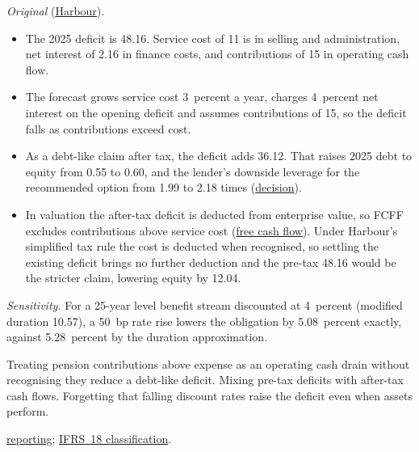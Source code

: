\begin{qfmethod}
 \emph{Original} (\hyperref[ex:harbour-tools-statements]{Harbour}).
\begin{itemize}
\item The 2025 deficit is 48.16. Service cost of 11 is in selling and administration, net interest of 2.16 in finance costs, and contributions of 15 in operating cash flow.
\item The forecast grows service cost 3~percent a year, charges 4~percent net interest on the opening deficit and assumes contributions of 15, so the deficit falls as contributions exceed cost.
\item As a debt-like claim after tax, the deficit adds 36.12. That raises 2025 debt to equity from 0.55 to 0.60, and the lender's downside leverage for the recommended option from 1.99 to 2.18 times (\hyperref[ex:integrated-credit-decision]{decision}).
\item In valuation the after-tax deficit is deducted from enterprise value, so FCFF excludes contributions above service cost (\hyperref[meth:free-cash-flow-coverage]{free cash flow}). Under Harbour's simplified tax rule the cost is deducted when recognised, so settling the existing deficit brings no further deduction and the pre-tax 48.16 would be the stricter claim, lowering equity by 12.04.
\end{itemize}
\emph{Sensitivity.} For a 25-year level benefit stream discounted at 4~percent (modified duration 10.57), a 50~bp rate rise lowers the obligation by 5.08~percent exactly, against 5.28~percent by the duration approximation.

 Treating pension contributions above expense as an operating cash drain without recognising they reduce a debt-like deficit. Mixing pre-tax deficits with after-tax cash flows. Forgetting that falling discount rates raise the deficit even when assets perform.

 \hyperref[meth:post-employment-benefit-reporting]{reporting}; \hyperref[meth:accounting-change-effects]{IFRS~18 classification}.

\end{qfmethod}
